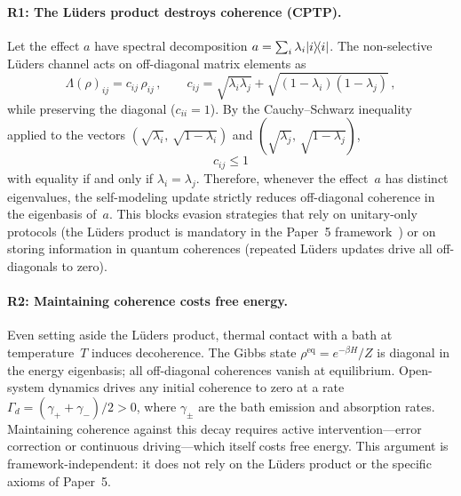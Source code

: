 \paragraph{R1: The Lüders product destroys coherence (CPTP).}
Let the effect $a$ have spectral decomposition
$a = \sum_i \lambda_i | i \rangle\!\langle i |$.  The non-selective Lüders
channel acts on off-diagonal matrix elements as
\begin{equation}
  \Lambda(\rho)_{ij}
  = c_{ij}\,\rho_{ij} \,,
  \qquad
  c_{ij}
  = \sqrt{\lambda_i\lambda_j}
  + \sqrt{(1-\lambda_i)(1-\lambda_j)} \,,
  \label{eq:decoherence-factor}
\end{equation}
while preserving the diagonal ($c_{ii} = 1$).  By the Cauchy--Schwarz
inequality applied to the vectors
$(\sqrt{\lambda_i},\,\sqrt{1-\lambda_i})$ and
$(\sqrt{\lambda_j},\,\sqrt{1-\lambda_j})$,
\begin{equation}
  c_{ij} \leq 1
  \label{eq:cij-bound}
\end{equation}
with equality if and only if $\lambda_i = \lambda_j$.  Therefore,
whenever the effect~$a$ has distinct eigenvalues, the self-modeling
update strictly reduces off-diagonal coherence in the eigenbasis
of~$a$.  This blocks evasion strategies that rely on unitary-only
protocols (the Lüders product is mandatory in the Paper~5
framework~\cite{Paper5}) or on storing information in quantum
coherences (repeated Lüders updates drive all off-diagonals to
zero).

\paragraph{R2: Maintaining coherence costs free energy.}
Even setting aside the Lüders product, thermal contact with a bath
at temperature~$T$ induces decoherence.  The Gibbs state
$\rho^{\mathrm{eq}} = e^{-\beta H}/Z$ is diagonal in the energy
eigenbasis; all off-diagonal coherences vanish at equilibrium.
Open-system dynamics drives any initial coherence to zero at a rate
$\Gamma_d = (\gamma_+ + \gamma_-)/2 > 0$, where $\gamma_{\pm}$ are
the bath emission and absorption rates.  Maintaining coherence
against this decay requires active intervention---error correction or
continuous driving---which itself costs free energy.  This argument
is framework-independent: it does not rely on the Lüders product
or the specific axioms of Paper~5.

